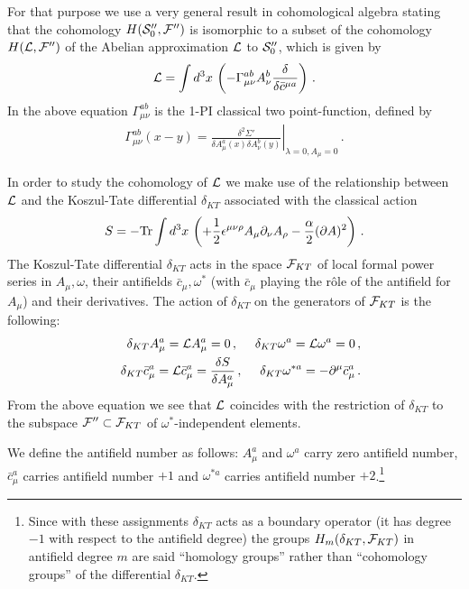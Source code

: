 \documentclass[a4paper,11pt]{article}
\def\G{\Gamma}
\begin{document}
For that purpose we use 
a very general result in cohomological algebra 
\cite{Piguet:er,Barnich:2000zw} stating that the
cohomology $H({\cal S}_0'',{\cal F}'')$ is isomorphic to a subset of 
the cohomology
$H({\cal L},{\cal F}'')$ of the Abelian approximation ${\cal L}$ to 
${\cal S}_0''$, which is given by
%
\begin{eqnarray}
{\cal L} = \int d^3x \, \left ( - \G^{ab}_{\mu\nu} A^b_\nu 
                             \frac{\delta}{\delta {\bar c}^{\mu a}} \right ) \, .
\label{wz5}
\end{eqnarray}
%
In the above equation $\G^{ab}_{\mu\nu}$ is the 1-PI classical 
two point-function,
defined by
%
\begin{eqnarray}
\G^{ab}_{\mu\nu}(x-y) = \left . \frac{\delta ^2 \Sigma'}{\delta A^a_\mu(x)
\delta A^b_\nu(y)} \right |_{\lambda=0, A_\mu=0} \, .
\label{wz6}
\end{eqnarray}
%

In order to study the cohomology of ${\cal L}$ we make use of the relationship
between ${\cal L}$ and the Koszul-Tate differential $\delta_{KT}$ \cite{Barnich:2000zw}
associated with the classical action
%
\begin{eqnarray}
S = - {\rm Tr} \int d^3x \, \left ( +\frac{1}{2} 
\epsilon^{\mu\nu\rho} A_\mu \partial_\nu A_\rho -
\frac{\alpha}{2} ( \partial A)^2 \right ) \, . 
\label{kt1}
\end{eqnarray}
%
%
The Koszul-Tate differential $\delta_{KT}$ acts in the space ${\cal F}_{KT}$
of local formal power series in $A_\mu,\omega$, 
their antifields $\bar c_\mu,\omega^*$ (with $\bar c_\mu$ playing the r\^ole of the antifield for $A_\mu$)
and their derivatives. The action of $\delta_{KT}$ on the generators of ${\cal F}_{KT}$ 
is the following:
%
\begin{eqnarray}
&& \delta_{KT} A_\mu^a = {\cal L} A_\mu^a = 0 \, , ~~~~ \delta_{KT} \omega^a = {\cal L} \omega^a = 0 \, , 
\nonumber \\
&& \delta_{KT} \bar c^a_\mu = {\cal L} \bar c^a_\mu = \frac{\delta S}{\delta A_\mu^a} \, , 
~~~~ \delta_{KT} \omega^{*a} = - \partial^\mu \bar c^{a}_\mu \, .
\label{kt_new1}
\end{eqnarray}
%
From the above equation we see that ${\cal L}$ coincides with the restriction of $\delta_{KT}$
to the subspace ${\cal F}'' \subset {\cal F}_{KT}$  of $\omega^*$-independent elements.

We define the antifield number as follows: $A_\mu^a$ and $\omega^a$
carry zero antifield number, $\bar c^a_\mu$ carries antifield number $+1$
and $\omega^{*a}$ carries antifield number $+2$.\footnote{Since with these
assignments $\delta_{KT}$ acts as a boundary operator (it has
degree $-1$ with respect to the antifield degree) the groups 
$H_m(\delta_{KT},{\cal F}_{KT})$ in antifield degree $m$
are said ``homology groups'' rather than ``cohomology groups'' of 
the differential $\delta_{KT}$.}
\end{document}

